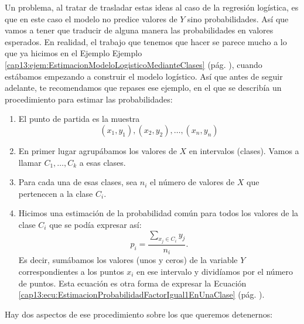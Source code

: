Un problema, al tratar de trasladar estas ideas al caso de la regresión logística, es que en este caso el modelo no predice valores de $Y$ sino probabilidades. Así que vamos a tener que traducir de alguna manera las probabilidades en valores esperados. En realidad, el trabajo que tenemos que hacer se parece mucho a lo que ya hicimos en el Ejemplo Ejemplo
\ref{cap13:ejem:EstimacionModeloLogisticoMedianteClases}
(pág.  \pageref{cap13:ejem:EstimacionModeloLogisticoMedianteClases}), cuando estábamos empezando a construir el modelo logístico.  Así que antes de seguir adelante, te recomendamos que repases ese ejemplo, en el que se describía un procedimiento para estimar las probabilidades:

\begin{enumerate}
	\item El punto de partida es la muestra
	\[(x_1, y_1), (x_2, y_2), \ldots, (x_n, y_n)\]
	\item En primer lugar agrupábamos los valores de $X$ en intervalos (clases). Vamos a llamar $C_1, \ldots, C_k$ a esas clases.
	\item Para cada una de esas clases, sea $n_i$ el número de valores de $X$ que pertenecen a la clase $C_i$.
	\item Hicimos una estimación de la probabilidad común para todos los valores de la clase $C_i$ que se podía expresar así:
	\[\hat p_i = \dfrac{\displaystyle\sum_{x_j\in C_i} y_j}{n_i}.\]
	Es decir, sumábamos los valores (unos y ceros) de la variable $Y$ correspondientes a los puntos $x_i$ en  ese intervalo y dividíamos por el número de puntos. Esta ecuación es otra forma de expresar la Ecuación \ref{cap13:ecu:EstimacionProbabilidadFactorIgual1EnUnaClase} (pág. \pageref{cap13:ecu:EstimacionProbabilidadFactorIgual1EnUnaClase}).
\end{enumerate}

Hay dos aspectos de ese procedimiento sobre los que queremos detenernos:

